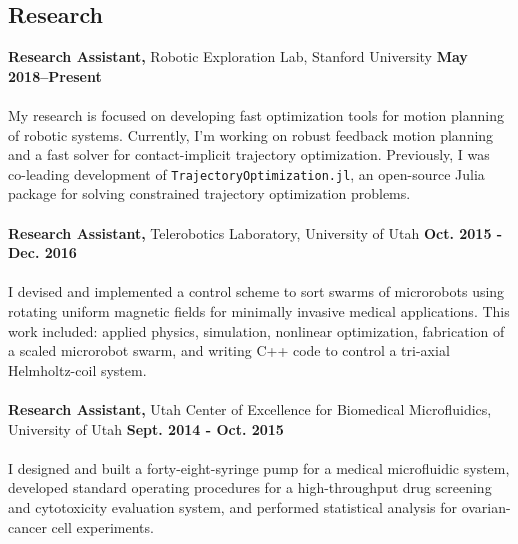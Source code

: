 \documentclass[margin,line]{res}
\begin{document}
\begin{resume}
\section{\sc Research}
{\bf Research Assistant,} Robotic Exploration Lab, Stanford University
\hfill {\bf May 2018--Present}\\
\\
My research is focused on developing fast optimization tools for motion planning of robotic systems. Currently, I'm working on robust feedback motion planning and a fast solver for contact-implicit trajectory optimization. Previously, I was co-leading development of \texttt{TrajectoryOptimization.jl}, an open-source Julia package for solving constrained trajectory optimization problems. \\
\\
{\bf Research Assistant,} Telerobotics Laboratory, University of Utah
\hfill {\bf Oct. 2015 - Dec. 2016}\\
\\
I devised and implemented a control scheme to sort swarms of microrobots using rotating uniform
magnetic fields for minimally invasive medical applications. This work included: applied physics, simulation, nonlinear optimization, fabrication of a scaled microrobot swarm, and writing C++ code to control a tri-axial Helmholtz-coil system.\\
\\
{\bf Research Assistant,} Utah Center of Excellence for Biomedical Microfluidics, University of Utah
\hfill {\bf Sept. 2014 - Oct. 2015}\\
\\
I designed and built a forty-eight-syringe pump for a medical microfluidic system, developed standard operating procedures for a high-throughput drug screening and cytotoxicity evaluation system, and performed statistical analysis for ovarian-cancer cell experiments.\\


\end{resume}
\end{document}
